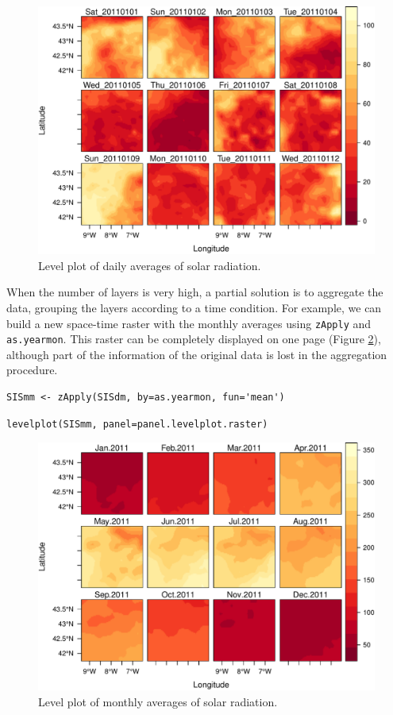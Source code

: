 \documentclass[smallroyalvopaper]{memoir}
\begin{document}
\begin{figure}[htb]
\centering
\includegraphics[width=.9\linewidth]{figs/SISdm.pdf}
\caption{\label{fig:SISdm}Level plot of daily averages of solar radiation.}
\end{figure}

When the number of layers is very high, a partial solution is to
aggregate the data, grouping the layers according to a time
condition. For example, we can build a new space-time raster with
the monthly averages using \texttt{zApply} and \texttt{as.yearmon}. This raster
can be completely displayed on one page (Figure \ref{fig:SISmm}),
although part of the information of the original data is lost in
the aggregation procedure.


\lstset{language=R,numbers=none}
\begin{lstlisting}
SISmm <- zApply(SISdm, by=as.yearmon, fun='mean')
\end{lstlisting}

\lstset{language=R,numbers=none}
\begin{lstlisting}
levelplot(SISmm, panel=panel.levelplot.raster)
\end{lstlisting}

\begin{figure}[htb]
\centering
\includegraphics[width=.9\linewidth]{figs/SISmm.pdf}
\caption{\label{fig:SISmm}Level plot of monthly averages of solar radiation.}
\end{figure}
\end{document}
